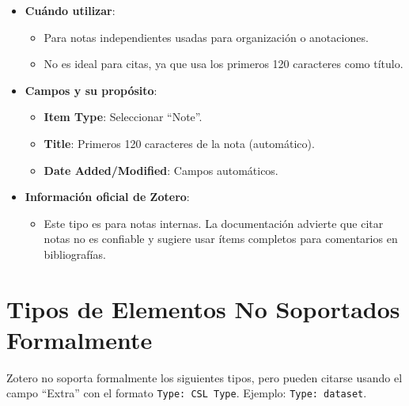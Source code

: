 \documentclass[
  jou,
  floatsintext,
  longtable,
  a4paper,
  nolmodern,
  notxfonts,
  notimes,
  12pt,
  colorlinks=true,linkcolor=blue,citecolor=blue,urlcolor=blue]{apa7}
\providecommand{\tightlist}{%
  \setlength{\itemsep}{0pt}\setlength{\parskip}{0pt}}
\begin{document}
\begin{itemize}
\tightlist
\item
  \textbf{Cuándo utilizar}:

  \begin{itemize}
  \tightlist
  \item
    Para notas independientes usadas para organización o anotaciones.
  \item
    No es ideal para citas, ya que usa los primeros 120 caracteres como
    título.
  \end{itemize}
\item
  \textbf{Campos y su propósito}:

  \begin{itemize}
  \tightlist
  \item
    \textbf{Item Type}: Seleccionar ``Note''.
  \item
    \textbf{Title}: Primeros 120 caracteres de la nota (automático).
  \item
    \textbf{Date Added/Modified}: Campos automáticos.
  \end{itemize}
\item
  \textbf{Información oficial de Zotero}:

  \begin{itemize}
  \tightlist
  \item
    Este tipo es para notas internas. La documentación advierte que
    citar notas no es confiable y sugiere usar ítems completos para
    comentarios en bibliografías.
  \end{itemize}
\end{itemize}

\section{Tipos de Elementos No Soportados
Formalmente}\label{tipos-de-elementos-no-soportados-formalmente}

Zotero no soporta formalmente los siguientes tipos, pero pueden citarse
usando el campo ``Extra'' con el formato \texttt{Type:\ CSL\ Type}.
Ejemplo: \texttt{Type:\ dataset}.
\end{document}
